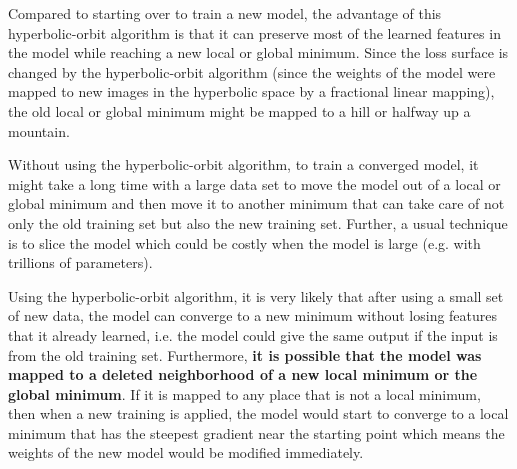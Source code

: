 \documentclass{article}
\theoremstyle{plain}
\theoremstyle{plain} %
\theoremstyle{definition}  %
\theoremstyle{remark}  %
\theoremstyle{plain}
\begin{document}
Compared to starting over to train a new model, the advantage of this hyperbolic-orbit algorithm is that it can preserve most of the learned features in the model while reaching a new local or global minimum. Since the loss surface is changed by the hyperbolic-orbit algorithm (since the weights of the model were mapped to new images in the hyperbolic space by a fractional linear mapping), the old local or global minimum might be mapped to a hill or halfway up a mountain.

Without using the hyperbolic-orbit algorithm, to train a converged model, it might take a long time with a large data set to move the model out of a local or global minimum and then move it to another minimum that can take care of not only the old training set but also the new training set. Further, a usual technique is to slice the model\cite{zhang2022toward} which could be costly when the model is large (e.g. with trillions of parameters).

Using the hyperbolic-orbit algorithm, it is very likely that after using a small set of new data, the model can converge to a new minimum without losing features that it already learned, i.e. the model could give the same output if the input is from the old training set. Furthermore, \textbf{it is possible that the model was mapped to a deleted neighborhood of a new local minimum or the global minimum}. If it is mapped to any place that is not a local minimum, then when a new training is applied, the model would start to converge to a local minimum that has the steepest gradient near the starting point which means the weights of the new model would be modified immediately.


\end{document}

